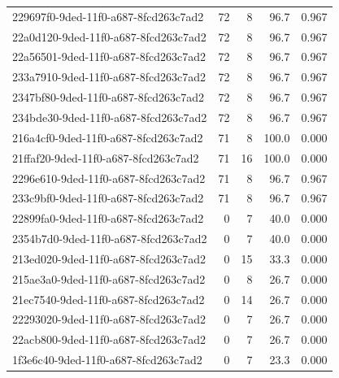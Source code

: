 \begin{longtable}{l r r r r}
229697f0-9ded-11f0-a687-8fcd263c7ad2 & 72 & 8 & 96.7 & 0.967 \\

22a0d120-9ded-11f0-a687-8fcd263c7ad2 & 72 & 8 & 96.7 & 0.967 \\

22a56501-9ded-11f0-a687-8fcd263c7ad2 & 72 & 8 & 96.7 & 0.967 \\

233a7910-9ded-11f0-a687-8fcd263c7ad2 & 72 & 8 & 96.7 & 0.967 \\

2347bf80-9ded-11f0-a687-8fcd263c7ad2 & 72 & 8 & 96.7 & 0.967 \\

234bde30-9ded-11f0-a687-8fcd263c7ad2 & 72 & 8 & 96.7 & 0.967 \\

216a4cf0-9ded-11f0-a687-8fcd263c7ad2 & 71 & 8 & 100.0 & 0.000 \\

21ffaf20-9ded-11f0-a687-8fcd263c7ad2 & 71 & 16 & 100.0 & 0.000 \\

2296e610-9ded-11f0-a687-8fcd263c7ad2 & 71 & 8 & 96.7 & 0.967 \\

233c9bf0-9ded-11f0-a687-8fcd263c7ad2 & 71 & 8 & 96.7 & 0.967 \\

22899fa0-9ded-11f0-a687-8fcd263c7ad2 & 0 & 7 & 40.0 & 0.000 \\

2354b7d0-9ded-11f0-a687-8fcd263c7ad2 & 0 & 7 & 40.0 & 0.000 \\

213ed020-9ded-11f0-a687-8fcd263c7ad2 & 0 & 15 & 33.3 & 0.000 \\

215ae3a0-9ded-11f0-a687-8fcd263c7ad2 & 0 & 8 & 26.7 & 0.000 \\

21ec7540-9ded-11f0-a687-8fcd263c7ad2 & 0 & 14 & 26.7 & 0.000 \\

22293020-9ded-11f0-a687-8fcd263c7ad2 & 0 & 7 & 26.7 & 0.000 \\

22acb800-9ded-11f0-a687-8fcd263c7ad2 & 0 & 7 & 26.7 & 0.000 \\

1f3e6c40-9ded-11f0-a687-8fcd263c7ad2 & 0 & 7 & 23.3 & 0.000 \\


\end{longtable}
